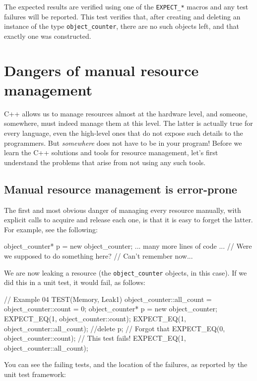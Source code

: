 The expected results are verified using one of the \texttt{EXPECT\_*} macros and any test failures will be reported. This test verifies that, after creating and deleting an instance of the type \texttt{object\_counter}, there are no such objects left, and that exactly one was constructed.

\section{Dangers of manual resource management}

C++ allows us to manage resources almost at the hardware level, and someone, somewhere, must indeed manage them at this level. The latter is actually true for every language, even the high-level ones that do not expose such details to the programmers. But \emph{somewhere} does not have to be in your program! Before we learn the C++ solutions and tools for resource management, let's first understand the problems that arise from not using any such tools.

\subsection{Manual resource management is error-prone}

The first and most obvious danger of managing every resource manually, with explicit calls to acquire and release each one, is that it is easy to forget the latter. For example, see the following:

\begin{code}
{
  object_counter* p = new object_counter;
  ... many more lines of code ...
  // Were we supposed to do something here?
  // Can't remember now...
}
\end{code}

We are now leaking a resource (the \texttt{object\_counter} objects, in this case). If we did this in a unit test, it would fail, as follows:

\begin{code}
// Example 04
TEST(Memory, Leak1) {
  object_counter::all_count = object_counter::count = 0;
  object_counter* p = new object_counter;
  EXPECT_EQ(1, object_counter::count);
  EXPECT_EQ(1, object_counter::all_count);
  //delete p;  // Forgot that
  EXPECT_EQ(0, object_counter::count); // This test fails!
  EXPECT_EQ(1, object_counter::all_count);
}
\end{code}

You can see the failing tests, and the location of the failures, as reported by the unit test framework:

